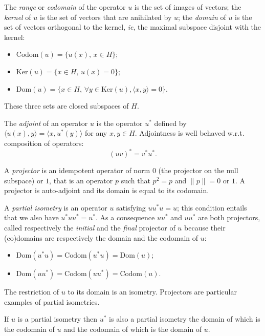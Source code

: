 The \emph{range} or \emph{codomain} of the operator \(u\) is the set of
images of vectors; the \emph{kernel} of \(u\) is the set of vectors that
are anihilated by \(u\); the \emph{domain} of \(u\) is the set of
vectors orthogonal to the kernel, \emph{ie}, the maximal subspace
disjoint with the kernel:
\begin{itemize}
\item \(\mathrm{Codom}(u) = \{u(x),\, x\in H\}\);
\item \(\mathrm{Ker}(u) = \{x\in H,\, u(x) = 0\}\);
\item \(\mathrm{Dom}(u) = \{x\in H,\, \forall y\in\mathrm{Ker}(u), \langle x, y\rangle = 0\}\).
\end{itemize}

These three sets are closed subspaces of \(H\).

The \emph{adjoint} of an operator \(u\) is the operator \(u^*\) defined
by \(\langle u(x), y\rangle = \langle x, u^*(y)\rangle\) for any
\(x,y\in H\). Adjointness is well behaved w.r.t. composition of
operators:
\begin{equation*}
(uv)^* = v^*u^*.
\end{equation*}

A \emph{projector} is an idempotent operator of norm \(0\) (the
projector on the null subspace) or \(1\), that is an operator \(p\) such
that \(p^2 = p\) and \(\|p\| = 0\) or \(1\). A projector is auto-adjoint
and its domain is equal to its codomain.

A \emph{partial isometry} is an operator \(u\) satisfying \(uu^* u =
u\); this condition entails that we also have \(u^*uu^* =
u^*\). As a consequence \(uu^*\) and \(uu^*\) are both projectors,
called respectively the \emph{initial} and the \emph{final} projector of
\(u\) because their (co)domains are respectively the domain and the
codomain of \(u\):
\begin{itemize}
\item \(\mathrm{Dom}(u^*u) = \mathrm{Codom}(u^*u) = \mathrm{Dom}(u)\);
\item \(\mathrm{Dom}(uu^*) = \mathrm{Codom}(uu^*) = \mathrm{Codom}(u)\).
\end{itemize}

The restriction of \(u\) to its domain is an isometry. Projectors are
particular examples of partial isometries.

If \(u\) is a partial isometry then \(u^*\) is also a partial isometry
the domain of which is the codomain of \(u\) and the codomain of which
is the domain of \(u\).

